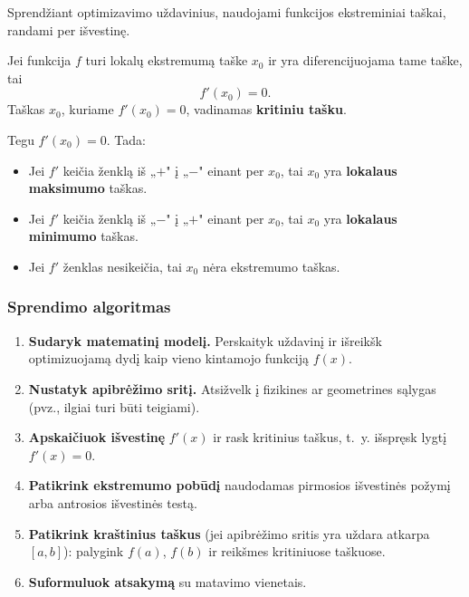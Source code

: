 Sprendžiant optimizavimo uždavinius, naudojami funkcijos ekstreminiai taškai,
randami per išvestinę.

\begin{theorem}
Jei funkcija $f$ turi lokalų ekstremumą taške $x_0$ ir yra diferencijuojama tame
taške, tai
\[
f'(x_0) = 0.
\]
Taškas $x_0$, kuriame $f'(x_0) = 0$, vadinamas \textbf{kritiniu tašku}.
\end{theorem}

\begin{theorem}
Tegu $f'(x_0)=0$. Tada:
\begin{itemize}
    \item Jei $f'$ keičia ženklą iš „$+$" į „$-$" einant per $x_0$, tai $x_0$ yra
          \textbf{lokalaus maksimumo} taškas.
    \item Jei $f'$ keičia ženklą iš „$-$" į „$+$" einant per $x_0$, tai $x_0$ yra
          \textbf{lokalaus minimumo} taškas.
    \item Jei $f'$ ženklas nesikeičia, tai $x_0$ nėra ekstremumo taškas.
\end{itemize}
\end{theorem}

\subsubsection*{Sprendimo algoritmas}

\begin{enumerate}
    \item \textbf{Sudaryk matematinį modelį.} Perskaityk uždavinį ir išreikšk
          optimizuojamą dydį kaip vieno kintamojo funkciją $f(x)$.
    \item \textbf{Nustatyk apibrėžimo sritį.} Atsižvelk į fizikines ar geometrines
          sąlygas (pvz., ilgiai turi būti teigiami).
    \item \textbf{Apskaičiuok išvestinę} $f'(x)$ ir rask kritinius taškus, t.~y.
          išspręsk lygtį $f'(x) = 0$.
    \item \textbf{Patikrink ekstremumo pobūdį} naudodamas pirmosios išvestinės požymį
          arba antrosios išvestinės testą.
    \item \textbf{Patikrink kraštinius taškus} (jei apibrėžimo sritis yra uždara
          atkarpa $[a,b]$): palygink $f(a)$, $f(b)$ ir reikšmes kritiniuose taškuose.
    \item \textbf{Suformuluok atsakymą} su matavimo vienetais.
\end{enumerate}

